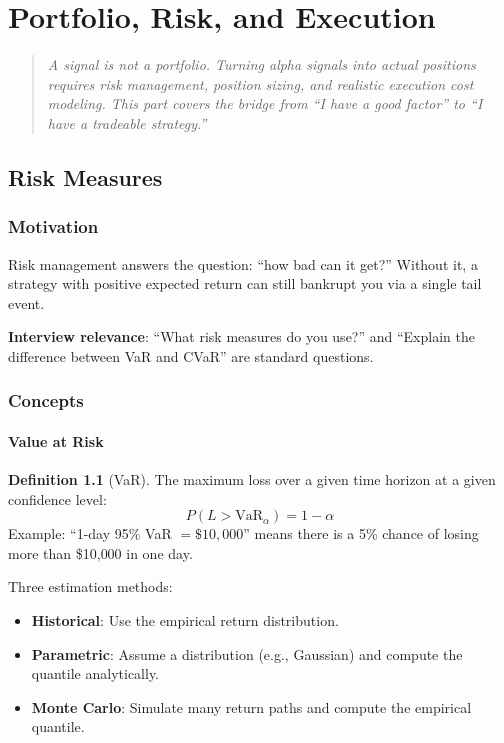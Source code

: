 \documentclass[a4paper, 11pt]{report}
\theoremstyle{definition}
\newtheorem{definition}{Definition}[chapter]
\theoremstyle{remark}
\begin{document}
\part{Portfolio, Risk, and Execution}
\label{part:portfolio}

\begin{quote}
\itshape
A signal is not a portfolio.  Turning alpha signals into actual positions
requires risk management, position sizing, and realistic execution cost
modeling.  This part covers the bridge from ``I have a good factor'' to
``I have a tradeable strategy.''
\end{quote}


\chapter{Risk Measures}
\label{ch:risk}

\section{Motivation}

Risk management answers the question: ``how bad can it get?''  Without it, a
strategy with positive expected return can still bankrupt you via a single
tail event.

\textbf{Interview relevance}: ``What risk measures do you use?'' and
``Explain the difference between VaR and CVaR'' are standard questions.

\section{Concepts}

\subsection{Value at Risk}

\begin{definition}[VaR]
    The maximum loss over a given time horizon at a given confidence level:
    \[
        P(L > \text{VaR}_\alpha) = 1 - \alpha
    \]
    Example: ``1-day 95\% VaR $= \$10{,}000$'' means there is a 5\% chance
    of losing more than \$10{,}000 in one day.

    Three estimation methods:
    \begin{itemize}
        \item \textbf{Historical}: Use the empirical return distribution.
        \item \textbf{Parametric}: Assume a distribution (e.g., Gaussian)
              and compute the quantile analytically.
        \item \textbf{Monte Carlo}: Simulate many return paths and compute
              the empirical quantile.
    \end{itemize}
\end{definition}
\end{document}
